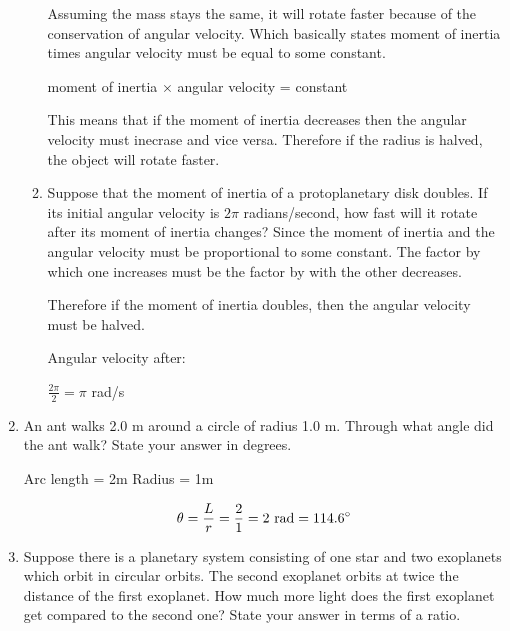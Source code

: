 \documentclass[12pt]{article}
\begin{document}
\begin{enumerate}
\begin{enumerate}
                    Assuming the mass stays the same, it will rotate faster because of the conservation of angular velocity. Which basically states moment of inertia times angular velocity must be equal to some constant.\newline

                    moment of inertia $\times$ angular velocity = constant\newline

                    This means that if the moment of inertia decreases then the angular velocity must inecrase and vice versa. Therefore if the radius is halved, the object will rotate faster.

              \item Suppose that the moment of inertia of a protoplanetary disk doubles. If its initial angular velocity is $2\pi$ radians/second, how fast will it rotate after its moment of inertia changes?\newline\newline
                    Since the moment of inertia and the angular velocity must be proportional to some constant. The factor by which one increases must be the factor by with the other decreases.\newline

                    Therefore if the moment of inertia doubles, then the angular velocity must be halved.\newline

                    Angular velocity after: \newline
                    \centerline{$\frac{2\pi}{2} = \pi  $ rad/s}


            \end{enumerate}
        \item An ant walks 2.0 m around a circle of radius 1.0 m. Through what angle
        did the ant walk? State your answer in degrees.\newline

        Arc length = 2m\newline
        Radius = 1m

        \begin{equation}
          \theta = \frac{L}{r} = \frac{2}{1} =  2 \textnormal{ rad} = 114.6^{\circ}
        \end{equation}

        \item Suppose there is a planetary system consisting of one star and two exoplanets which orbit in circular orbits. The second exoplanet orbits at twice the distance of the first exoplanet. How much more light does the first exoplanet get compared to the second one? State your answer in terms of a ratio.\newline


\end{enumerate}
\end{document}
